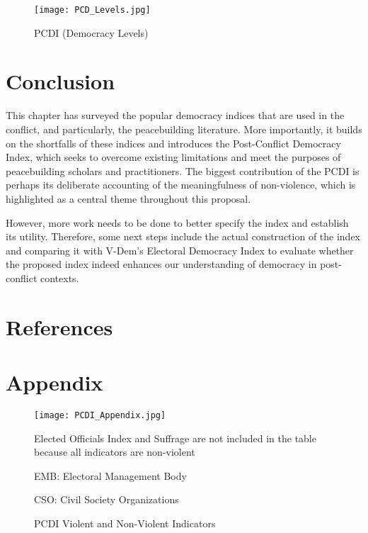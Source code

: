 \documentclass [11pt]{article}
\begin{document}
\begin{figure} [h!]

\caption{PCDI (Democracy Levels)}
\label{fig4}%
\begin{center} 
\small
 \texttt{[image: PCD\_Levels.jpg]}
\end{center} 
\end{figure}

\section*{Conclusion}

This chapter has surveyed the popular democracy indices that are used in the conflict, and particularly, the peacebuilding literature. More importantly, it builds on the shortfalls of these indices and introduces the Post-Conflict Democracy Index, which seeks to overcome existing limitations and meet the purposes of peacebuilding scholars and practitioners. The biggest contribution of the PCDI is perhaps its deliberate accounting of the meaningfulness of non-violence, which is highlighted as a central theme throughout this proposal.

However, more work needs to be done to better specify the index and establish its utility. Therefore, some next steps include the actual construction of the index and comparing it with V-Dem's Electoral Democracy Index to evaluate whether the proposed index indeed enhances our understanding of democracy in post-conflict contexts.

\section*{References} 

\begin{hangparas}{1cm}{1}

\end{hangparas}

\section*{Appendix}

\begin{figure} [h!]

\caption{PCDI Violent and Non-Violent Indicators}
\begin{center} 
\small
 \texttt{[image: PCDI\_Appendix.jpg]}
 
{\footnotesize Elected Officials Index and Suffrage are not included in the table because all indicators are non-violent}

{\footnotesize EMB: Electoral Management Body}
 
{\footnotesize CSO: Civil Society Organizations}
 
\end{center}
\end{figure}
\end{document}
